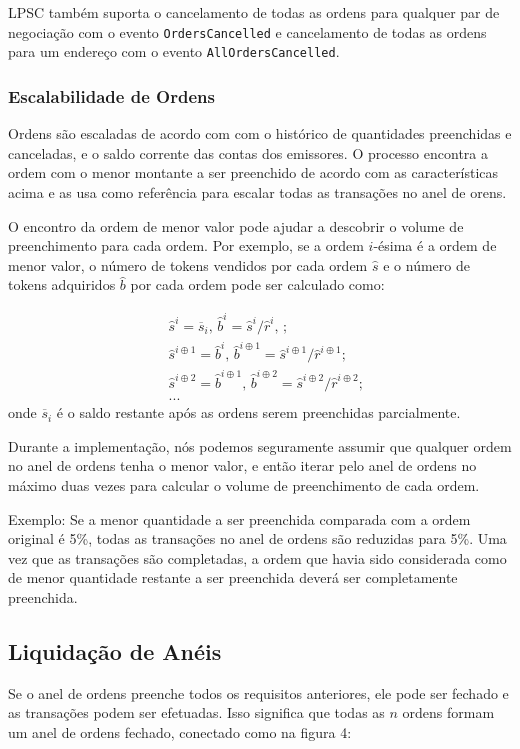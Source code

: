 \documentclass[UTF8,nofonts]{article}
\begin{document}
\begin{multicols}{2}
LPSC também suporta o cancelamento de todas as ordens para qualquer par de negociação com o evento \verb|OrdersCancelled| e cancelamento de todas as ordens para um endereço com o evento \verb|AllOrdersCancelled|.

\subsubsection{Escalabilidade de Ordens\label{sec:order_scaling}}
Ordens são escaladas de acordo com com o histórico de quantidades preenchidas e canceladas, e o saldo corrente das contas dos emissores. O processo encontra a ordem com o  menor montante a ser preenchido de acordo com as características acima e as usa como referência  para escalar todas as transações no anel de orens.

O encontro da ordem de menor valor pode ajudar a descobrir o volume de preenchimento para cada ordem. Por exemplo, se a ordem $i$-ésima é a ordem de menor valor, o número de tokens vendidos por cada ordem $\hat{s}$ e o número de tokens adquiridos $\hat{b}$ por cada ordem pode ser calculado como:

\[
\begin{split}
&\hat{s}^{i}=\overline{s}_i\text{, } \hat{b}^{i}=\hat{s}^{i}/ \hat{r}^i\text{, }\text{;}\\
&\hat{s}^{i\oplus 1}=\hat{b}^i\text{, } \hat{b}^{i\oplus 1}=\hat{s}^{i\oplus 1}/ \hat{r}^{i\oplus 1}\text{;}\\
&\hat{s}^{i\oplus 2}=\hat{b}^{i\oplus 1}\text{, } \hat{b}^{i\oplus 2}=\hat{s}^{i\oplus 2}/ \hat{r}^{i\oplus 2}\text{;}\\
& ...
\end{split}
\]
onde $\overline{s}_i$ é o saldo restante após as ordens serem preenchidas parcialmente.

Durante a implementação, nós podemos seguramente assumir que qualquer ordem no anel de ordens tenha o menor valor, e então iterar pelo anel de ordens no máximo duas vezes para calcular o volume de preenchimento de cada ordem.

Exemplo: Se a menor quantidade a ser preenchida comparada com a ordem original é 5\%, todas as transações no anel de ordens são reduzidas para 5\%. Uma vez que as transações são completadas, a ordem que havia sido considerada como de menor quantidade restante a ser preenchida deverá ser completamente preenchida.

\subsection{Liquidação de Anéis\label{sec:settlement}}
Se o anel de ordens preenche todos os requisitos anteriores, ele pode ser fechado e as transações podem ser efetuadas. Isso significa que todas as $n$ ordens formam um anel de ordens fechado, conectado como na figura 4:


\end{multicols}
\end{document}
